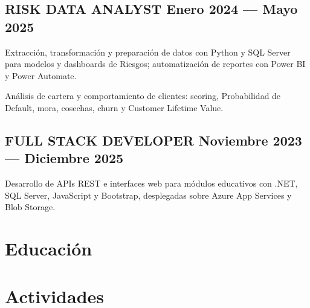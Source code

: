 \documentclass[letter,10pt]{article}
\begin{document}
\subsection{{RISK DATA ANALYST \hfill Enero 2024 --- Mayo 2025}}
\begin{zitemize}
\item Extracción, transformación y preparación de datos con Python y SQL Server para modelos y dashboards de Riesgos; automatización de reportes con Power BI y Power Automate.
\item Análisis de cartera y comportamiento de clientes: scoring, Probabilidad de Default, mora, cosechas, churn y Customer Lifetime Value.
\end{zitemize}

\subsection{{FULL STACK DEVELOPER \hfill Noviembre 2023 --- Diciembre 2025}}
\begin{zitemize}
\item Desarrollo de APIs REST e interfaces web para módulos educativos con .NET, SQL Server, JavaScript y Bootstrap, desplegadas sobre Azure App Services y Blob Storage.
\end{zitemize}


\section{Educación}


\section{Actividades}

\end{document}
